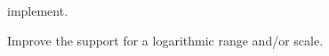 
\begin{DoxyRefList}
\item[\label{todo__todo000001}%
\hypertarget{todo__todo000001}{}%
Member \hyperlink{class_qext_serial_port_aa9e0de517b23cf177bc6d9aec2dbc5b0}{Qext\-Serial\-Port\-:\-:wait\-For\-Ready\-Read} (int msecs)]implement.  
\item[\label{todo__todo000003}%
\hypertarget{todo__todo000003}{}%
Class \hyperlink{class_qwt_thermo}{Qwt\-Thermo} ]Improve the support for a logarithmic range and/or scale. 
\end{DoxyRefList}